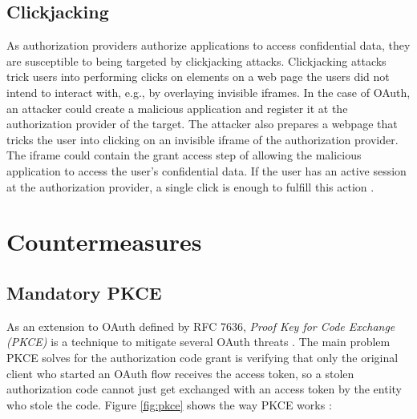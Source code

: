 \documentclass[
    fontsize=12pt,
    headings=small,
    parskip=half,           %
    bibliography=totoc,
    numbers=noenddot,       %
    open=any,               %
    ]{scrreprt}
\begin{document}
\subsection{Clickjacking}
\label{subsec:clickjacking}
As authorization providers authorize applications to access confidential data, they are susceptible to being targeted by clickjacking attacks. Clickjacking attacks trick users into performing clicks on elements on a web page the users did not intend to interact with, e.g., by overlaying invisible iframes. In the case of OAuth, an attacker could create a malicious application and register it at the authorization provider of the target. The attacker also prepares a webpage that tricks the user into clicking on an invisible iframe of the authorization provider. The iframe could contain the grant access step of allowing the malicious application to access the user's confidential data. If the user has an active session at the authorization provider, a single click is enough to fulfill this action \cite{gibbons2014security}. 


\section{Countermeasures}
\label{sec:oauth_countermeasures}
\subsection{Mandatory PKCE}
As an extension to OAuth defined by RFC 7636, \emph{Proof Key for Code Exchange (PKCE)} is a technique to mitigate several OAuth threats \cite{bradley2015rfc}. The main problem PKCE solves for the authorization code grant is verifying that only the original client who started an OAuth flow receives the access token, so a stolen authorization code cannot just get exchanged with an access token by the entity who stole the code. Figure \ref{fig:pkce} shows the way PKCE works \cite{siriwardena_oauth_2020}:
\end{document}
